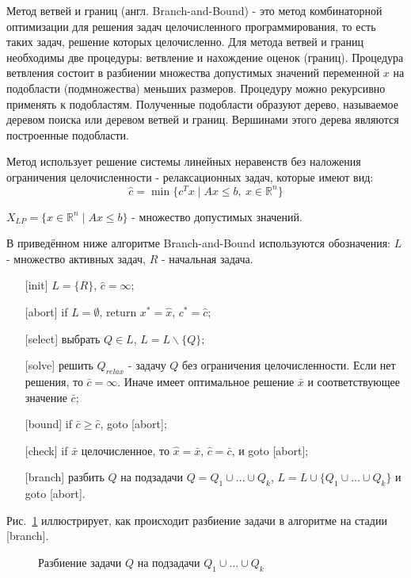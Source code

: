 \documentclass[a4paper,14pt,russian]{extreport}
\begin{document}
Метод ветвей и границ (англ. Branch-and-Bound) - это метод комбинаторной оптимизации для решения задач целочисленного программирования, то есть таких задач, решение которых целочисленно.  Для метода ветвей и границ необходимы две процедуры: ветвление и нахождение оценок (границ). Процедура ветвления состоит в разбиении множества допустимых значений переменной $x$ на подобласти (подмножества) меньших размеров. Процедуру можно рекурсивно применять к подобластям. Полученные подобласти образуют дерево, называемое деревом поиска или деревом ветвей и границ. Вершинами этого дерева являются построенные подобласти.
\par Метод использует решение системы линейных неравенств без наложения ограничения целочисленности - релаксационных задач, которые имеют вид: 
  $$\hat c = \min \{c^Tx \mid Ax\le b,~ x\in\mathbb{R}^n\}$$
\par $X_{LP} = \{x \in \mathbb{R}^n \mid Ax \le b\}$ - множество допустимых значений. 
\par В приведённом ниже алгоритме Branch-and-Bound используются обозначения: $L$ - множество активных задач, $R$ - начальная задача. 
  \begin{enumerate}
  \item[{[init]}] $L = \{R\}$, $\hat c = \infty$;
  \item[{[abort]}] if $L = \emptyset$, return $x^*=\hat x$, $c^* = \hat c$;
  \item[[{select]}] выбрать $Q\in L$, $L = L \backslash \{ Q \}$;
  \item[[{solve]}] решить $Q_{relax}$ - задачу $Q$ без ограничения целочисленности. Если нет решения, то $\bar c = \infty$. Иначе имеет оптимальное решение $\bar x$ и соответствующее значение $\bar c$;
  \item[{[bound]}] if $\bar c \ge \hat c$, goto [abort];
  \item[{[check]}] if $\bar x$ целочисленное, то $\hat x = \bar x$, $\hat c = \bar c$, и goto [abort];
  \item[{[branch]}] разбить $Q$ на подзадачи $Q = Q_1 \cup \dots \cup Q_k$, $L = L \cup \{Q_1 \cup \dots \cup Q_k \}$ и goto [abort].
  \end{enumerate}
\par Рис.~\ref{ris:branching} иллюстрирует, как происходит разбиение задачи в алгоритме на стадии [branch].
\par
  \begin{figure}[h]
  \caption{Разбиение задачи $Q$ на подзадачи $Q_1 \cup \dots \cup Q_k$}
  \label{ris:branching}
  \end{figure}
\end{document}
